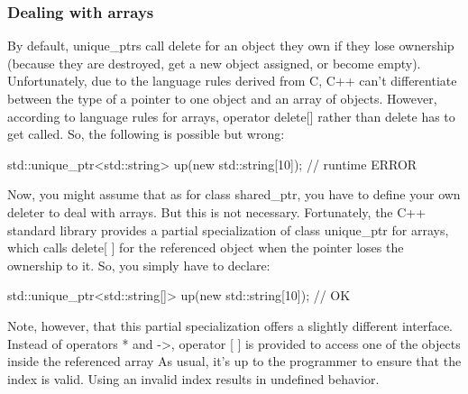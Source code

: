 \documentclass{report}
\begin{document}
\subsubsection{Dealing with arrays}
\bigbreak \noindent 
By default, unique\_ptrs call delete for an object they own if they lose ownership (because they
are destroyed, get a new object assigned, or become empty). Unfortunately, due to the language rules
derived from C, C++ can’t differentiate between the type of a pointer to one object and an array of
objects. However, according to language rules for arrays, operator delete[] rather than delete
has to get called. So, the following is possible but wrong:
\bigbreak \noindent 
\begin{cppcode}
std::unique_ptr<std::string> up(new std::string[10]); // runtime ERROR
\end{cppcode}
\bigbreak \noindent 
Now, you might assume that as for class shared\_ptr, you have to define your own deleter to deal with arrays. But this is not necessary.
\bigbreak \noindent 
Fortunately, the C++ standard library provides a partial specialization of class unique\_ptr for
arrays, which calls delete[ ] for the referenced object when the pointer loses the ownership to it.
So, you simply have to declare:
\bigbreak \noindent 
\begin{cppcode}
std::unique_ptr<std::string[]> up(new std::string[10]); // OK
\end{cppcode}
\bigbreak \noindent 
Note, however, that this partial specialization offers a slightly different interface. Instead of operators * and ->, operator [ ] is provided to access one of the objects inside the referenced array
\bigbreak \noindent 
As usual, it’s up to the programmer to ensure that the index is valid. Using an invalid index results in undefined behavior.

\bigbreak \noindent 
\end{document}
